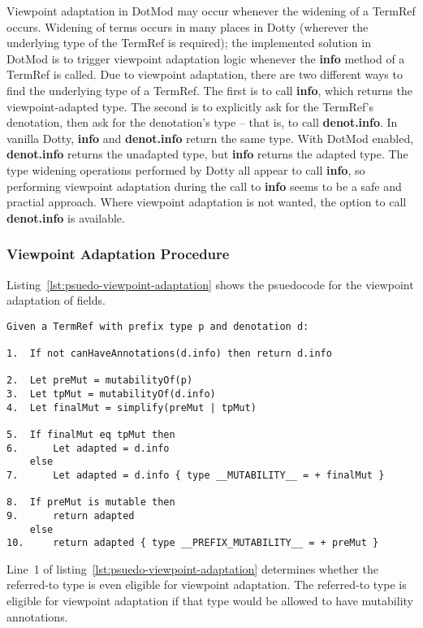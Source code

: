 \documentclass[11pt]{report}
\newcommand{\cdf}{\bf\ttfamily} %
\newcommand{\cd}{\cdf\small}  %
\begin{document}
Viewpoint adaptation in DotMod may occur whenever the widening of a TermRef occurs. Widening of terms occurs in many places in Dotty (wherever the underlying type of the TermRef is required); the implemented solution in DotMod is to trigger viewpoint adaptation logic whenever the {\cd info} method of a TermRef is called. Due to viewpoint adaptation, there are two different ways to find the underlying type of a TermRef. The first is to call {\cd info}, which returns the viewpoint-adapted type. The second is to explicitly ask for the TermRef's denotation, then ask for the denotation's type -- that is, to call {\cd denot.info}. In vanilla Dotty, {\cd info} and {\cd denot.info} return the same type. With DotMod enabled, {\cd denot.info} returns the unadapted type, but {\cd info} returns the adapted type. The type widening operations performed by Dotty all appear to call {\cd info}, so performing viewpoint adaptation during the call to {\cd info} seems to be a safe and practial approach. Where viewpoint adaptation is not wanted, the option to call {\cd denot.info} is available.

\subsubsection{Viewpoint Adaptation Procedure}

Listing~\ref{lst:psuedo-viewpoint-adaptation} shows the psuedocode for the viewpoint adaptation of fields.

\begin{lstlisting}[float=htbp, caption={Psuedocode for Viewpoint Adaptation of Fields}, label={lst:psuedo-viewpoint-adaptation}]
Given a TermRef with prefix type p and denotation d:

1.  If not canHaveAnnotations(d.info) then return d.info

2.  Let preMut = mutabilityOf(p)
3.  Let tpMut = mutabilityOf(d.info)
4.  Let finalMut = simplify(preMut | tpMut)

5.  If finalMut eq tpMut then
6.      Let adapted = d.info
    else
7.      Let adapted = d.info { type __MUTABILITY__ = + finalMut }

8.  If preMut is mutable then
9.      return adapted
    else
10.     return adapted { type __PREFIX_MUTABILITY__ = + preMut }
\end{lstlisting}

Line~1 of listing~\ref{lst:psuedo-viewpoint-adaptation} determines whether the referred-to type is even eligible for viewpoint adaptation.
The referred-to type is eligible for viewpoint adaptation if that type would be allowed to have mutability annotations.
\end{document}
